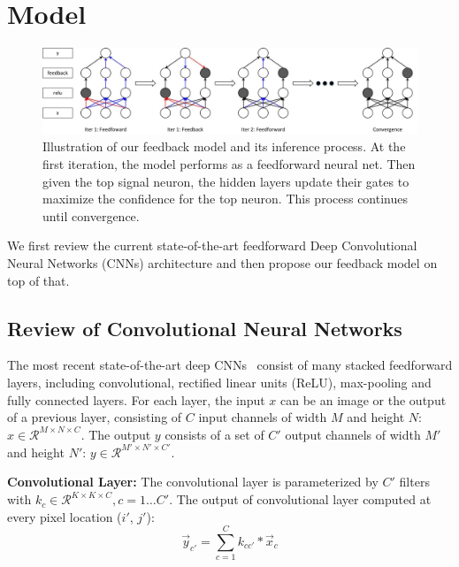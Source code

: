 \section{Model}
\label{sec:model}

\setlength{\tabcolsep}{2pt}
\begin{figure}
\begin{center}
\includegraphics[width=0.95\linewidth]{figs/model/model}
\caption{Illustration of our feedback model and its inference process. At the first iteration, the model performs as a feedforward neural net. Then given the top signal neuron, the hidden layers update their gates to maximize the confidence for the top neuron. This process continues until convergence.}
\label{fig:model}
\end{center}
\end{figure}

We first review the current state-of-the-art feedforward Deep Convolutional Neural Networks (CNNs) architecture and then propose our feedback model on top of that. 

\subsection{Review of Convolutional Neural Networks}
The most recent state-of-the-art deep CNNs~\cite{Simonyan2014Very} consist of many stacked feedforward layers, including convolutional, rectified linear units (ReLU), max-pooling and fully connected layers. For each layer, the input $x$ can be an image or the output of a previous layer, consisting of $C$ input channels of width $M$ and height $N$: $x \in \mathcal{R}^{M \times N \times C}$. The output $y$ consists of a set of $C'$ output channels of width $M'$ and height $N'$: $y \in \mathcal{R}^{M' \times N' \times C'}$. 

\textbf{Convolutional Layer:} 
The convolutional layer is parameterized by $C'$ filters with $k_c \in \mathcal{R}^{K \times K \times C}, c=1\ldots C'$. The output of convolutional layer computed at every pixel location ($i'$, $j'$):
\begin{equation}
\vec{y}_{c'} = \sum_{c=1}^C k_{cc'} * \vec{x}_c
\end{equation}

